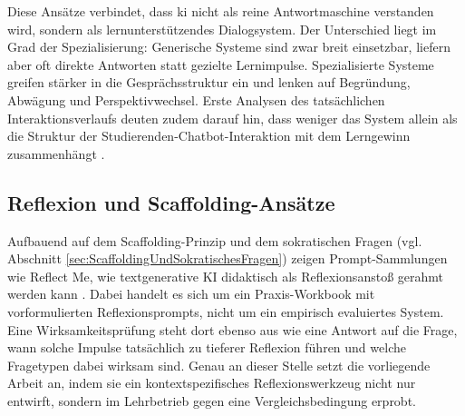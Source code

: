Diese Ansätze verbindet, dass \gls{ki} nicht als reine Antwortmaschine verstanden wird, sondern
als lernunterstützendes Dialogsystem.
Der Unterschied liegt im Grad der Spezialisierung: Generische Systeme sind zwar breit
einsetzbar, liefern aber oft direkte Antworten statt gezielte Lernimpulse.
Spezialisierte Systeme greifen stärker in die Gesprächsstruktur ein und lenken
auf Begründung, Abwägung und Perspektivwechsel. Erste Analysen des tatsächlichen Interaktionsverlaufs
deuten zudem darauf hin, dass weniger das System allein als die Struktur der
Studierenden-Chatbot-Interaktion mit dem Lerngewinn zusammenhängt \cite{khorDecodingStudentChatbot2026}.

\subsection{Reflexion und Scaffolding-Ansätze}
Aufbauend auf dem Scaffolding-Prinzip und dem sokratischen Fragen (vgl. Abschnitt
\ref{sec:ScaffoldingUndSokratischesFragen}) zeigen Prompt-Sammlungen wie
\glqq Reflect Me\grqq{}, wie textgenerative KI didaktisch als Reflexionsanstoß gerahmt werden kann
\cite{mollerReflectMeTextgenerative2025}. Dabei handelt es sich um ein Praxis-Workbook mit
vorformulierten Reflexionsprompts, nicht um ein empirisch evaluiertes System. Eine Wirksamkeitsprüfung
steht dort ebenso aus wie eine Antwort auf die Frage, wann solche Impulse tatsächlich zu tieferer
Reflexion führen und welche Fragetypen dabei wirksam sind. Genau an dieser Stelle setzt die
vorliegende Arbeit an, indem sie ein kontextspezifisches Reflexionswerkzeug nicht nur entwirft,
sondern im Lehrbetrieb gegen eine Vergleichsbedingung erprobt.

